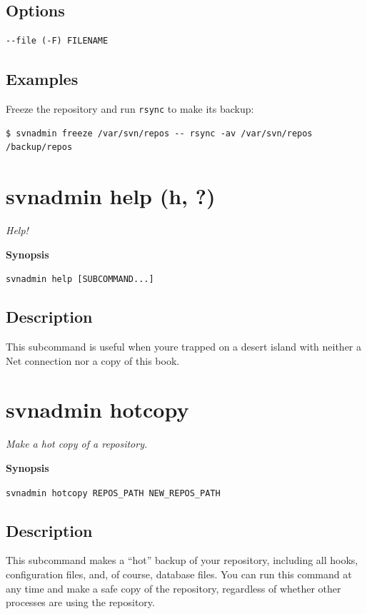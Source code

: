\subsection{Options}

\begin{verbatim}
--file (-F) FILENAME
\end{verbatim}

\subsection{Examples}

Freeze the repository and run \texttt{rsync} to make its backup:

\begin{verbatim}
$ svnadmin freeze /var/svn/repos -- rsync -av /var/svn/repos /backup/repos
\end{verbatim}

\section{svnadmin help (h, ?)}\label{svn.ref.svnadmin.c.help}

\emph{Help!}

\textbf{Synopsis}

\texttt{svnadmin\ help\ {[}SUBCOMMAND...{]}}

\subsection{Description}

This subcommand is useful when you\textquotesingle re trapped on a
desert island with neither a Net connection nor a copy of this book.

\section{svnadmin hotcopy}\label{svn.ref.svnadmin.c.hotcopy}

\emph{Make a hot copy of a repository.}

\textbf{Synopsis}

\texttt{svnadmin\ hotcopy\ REPOS\_PATH\ NEW\_REPOS\_PATH}

\subsection{Description}

This subcommand makes a ``hot'' backup of your repository, including all
hooks, configuration files, and, of course, database files. You can run
this command at any time and make a safe copy of the repository,
regardless of whether other processes are using the repository.

